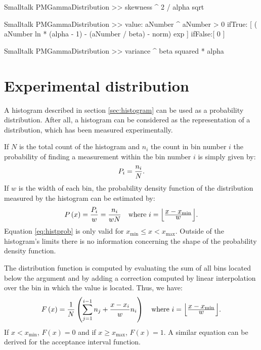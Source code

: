 \begin{displaycode}{Smalltalk}
PMGammaDistribution >> skewness
    ^ 2 / alpha sqrt
\end{displaycode}
    
\begin{displaycode}{Smalltalk}
PMGammaDistribution >> value: aNumber
    ^ aNumber > 0
        ifTrue: [ ( aNumber ln * (alpha - 1) - (aNumber / beta) - 
                                                            norm) exp ]
        ifFalse:[ 0 ]
\end{displaycode}
        
\begin{displaycode}{Smalltalk}
PMGammaDistribution >> variance
    ^ beta squared * alpha
\end{displaycode}

\section{Experimental distribution}
A histogram described in section \ref{sec:histogram} can be used
as a probability distribution. After all, a histogram can be
considered as the representation of a distribution, which has been
measured experimentally.

If $N$ is the total count of the histogram and $n_i$ the count in
bin number $i$ the probability of finding a measurement within the
bin number $i$ is simply given by:
\begin{equation}
  P_i={\displaystyle n_i \over\displaystyle N}.
\end{equation}
If $w$ is the width of each bin, the probability density function
of the distribution measured by the histogram can be estimated by:
\begin{equation}
\label{eq:histprob}
  P\left(x\right)={\displaystyle P_i \over\displaystyle w}
  ={\displaystyle n_i \over\displaystyle wN}\mbox{\quad
  where $i=\left\lfloor{\displaystyle x-x_{\min}\over\displaystyle w}\right\rfloor$.}
\end{equation}
Equation \ref{eq:histprob} is only valid for $x_{\min}\le x <
x_{\max}$. Outside of the histogram's limits there is no
information concerning the shape of the probability density
function.

The distribution function is computed by evaluating the sum of all
bins located below the argument and by adding a correction
computed by linear interpolation over the bin in which the value
is located. Thus, we have:
\begin{equation}
\label{eq:histdistr}
  F\left(x\right)={\displaystyle 1 \over\displaystyle N} \left(\sum_{j=1}^{i-1}n_j
  + {x-x_i \over w}n_i\right)
  \mbox{\quad where $i=\left\lfloor{\displaystyle x-x_{\min}\over\displaystyle w}\right\rfloor$.}
\end{equation}
If $x<x_{\min}$, $F\left(x\right)=0$ and if $x\geq x_{\max}$,
$F\left(x\right)=1$. A similar equation can be derived for the
acceptance interval function.


